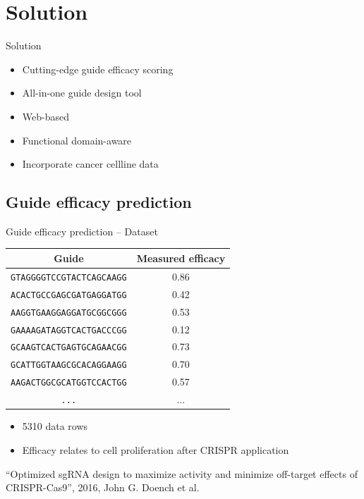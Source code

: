 \documentclass[Nike]{tuberlinbeamer}
\begin{document}
\section{Solution}

\begin{frame}{Solution}
  \begin{itemize}
    \item Cutting-edge guide efficacy scoring
    \item All-in-one guide design tool
    \item Web-based
    \item Functional domain-aware
    \item Incorporate cancer cellline data
  \end{itemize}
\end{frame}


\subsection{Guide efficacy prediction}

\begin{frame}{Guide efficacy prediction -- Dataset}
\begin{table}[]
    \centering
    \begin{tabular}{cc}
        \textbf{Guide} & \textbf{Measured efficacy} \\ \hline
\texttt{GTAGGGGTCCGTACTCAGCAAGG} & 0.86 \\
\texttt{ACACTGCCGAGCGATGAGGATGG} & 0.42 \\
\texttt{AAGGTGAAGGAGGATGCGGCGGG} & 0.53 \\
\texttt{GAAAAGATAGGTCACTGACCCGG} & 0.12 \\
\texttt{GCAAGTCACTGAGTGCAGAACGG} & 0.73 \\
\texttt{GCATTGGTAAGCGCACAGGAAGG} & 0.70 \\
\texttt{AAGACTGGCGCATGGTCCACTGG} & 0.57 \\
\texttt{...} & ... \\
    \end{tabular}
\end{table}
\begin{itemize}
  \item 5310 data rows
  \item Efficacy relates to cell proliferation after CRISPR application
\end{itemize}
\begin{flushright}
  \tiny
  ``Optimized sgRNA design to maximize activity and minimize off-target effects of CRISPR-Cas9'', 2016, John G. Doench et al.\
\end{flushright}
\end{frame}
\end{document}
